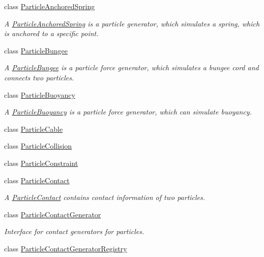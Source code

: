 \begin{DoxyCompactItemize}
class \mbox{\hyperlink{classr3_1_1_particle_anchored_spring}{Particle\+Anchored\+Spring}}
\begin{DoxyCompactList}\small\item\em A \mbox{\hyperlink{classr3_1_1_particle_anchored_spring}{Particle\+Anchored\+Spring}} is a particle generator, which simulates a spring, which is anchored to a specific point. \end{DoxyCompactList}\item 
class \mbox{\hyperlink{classr3_1_1_particle_bungee}{Particle\+Bungee}}
\begin{DoxyCompactList}\small\item\em A \mbox{\hyperlink{classr3_1_1_particle_bungee}{Particle\+Bungee}} is a particle force generator, which simulates a bungee cord and connects two particles. \end{DoxyCompactList}\item 
class \mbox{\hyperlink{classr3_1_1_particle_buoyancy}{Particle\+Buoyancy}}
\begin{DoxyCompactList}\small\item\em A \mbox{\hyperlink{classr3_1_1_particle_buoyancy}{Particle\+Buoyancy}} is a particle force generator, which can simulate buoyancy. \end{DoxyCompactList}\item 
class \mbox{\hyperlink{classr3_1_1_particle_cable}{Particle\+Cable}}
\item 
class \mbox{\hyperlink{classr3_1_1_particle_collision}{Particle\+Collision}}
\item 
class \mbox{\hyperlink{classr3_1_1_particle_constraint}{Particle\+Constraint}}
\item 
class \mbox{\hyperlink{classr3_1_1_particle_contact}{Particle\+Contact}}
\begin{DoxyCompactList}\small\item\em A \mbox{\hyperlink{classr3_1_1_particle_contact}{Particle\+Contact}} contains contact information of two particles. \end{DoxyCompactList}\item 
class \mbox{\hyperlink{classr3_1_1_particle_contact_generator}{Particle\+Contact\+Generator}}
\begin{DoxyCompactList}\small\item\em Interface for contact generators for particles. \end{DoxyCompactList}\item 
class \mbox{\hyperlink{classr3_1_1_particle_contact_generator_registry}{Particle\+Contact\+Generator\+Registry}}

\end{DoxyCompactItemize}
